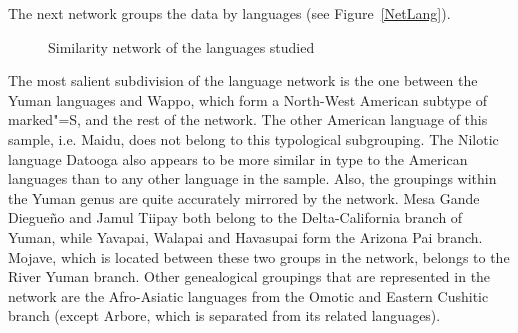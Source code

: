 The next network groups the data by languages (see Figure~\vref{NetLang}). 
\begin{figure}[h,t,b,p] \centering {}
\caption{Similarity network of the languages studied}\label{NetLang}
\end{figure}
The most salient subdivision of the language network is the one between the Yuman languages and Wappo, which form a North-West American subtype of marked"=S, and the rest of the network. 
The other American language of this sample, i.e. Maidu, does not belong to this typological subgrouping. 
The Nilotic language Datooga also appears to be more similar in type to the American languages than to any other language in the sample. 
Also, the groupings within the Yuman genus are quite accurately mirrored by the network. Mesa Gande Diegue\~no and Jamul Tiipay both belong to the Delta-California branch of Yuman, while Yavapai, Walapai and Havasupai form the Arizona Pai branch. 
Mojave, which is located between these two groups in the network, belongs to the River Yuman branch. 
Other genealogical groupings that are represented in the network are the Afro-Asiatic languages from the Omotic and Eastern Cushitic branch (except Arbore, which is separated from its related languages).
